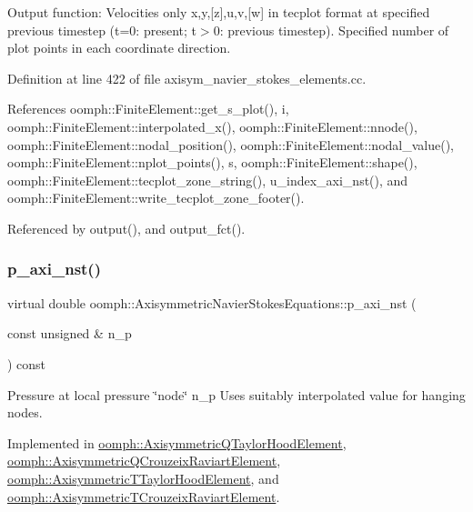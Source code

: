 Output function\+: Velocities only x,y,\mbox{[}z\mbox{]},u,v,\mbox{[}w\mbox{]} in tecplot format at specified previous timestep (t=0\+: present; t$>$0\+: previous timestep). Specified number of plot points in each coordinate direction. 

Definition at line 422 of file axisym\+\_\+navier\+\_\+stokes\+\_\+elements.\+cc.



References oomph\+::\+Finite\+Element\+::get\+\_\+s\+\_\+plot(), i, oomph\+::\+Finite\+Element\+::interpolated\+\_\+x(), oomph\+::\+Finite\+Element\+::nnode(), oomph\+::\+Finite\+Element\+::nodal\+\_\+position(), oomph\+::\+Finite\+Element\+::nodal\+\_\+value(), oomph\+::\+Finite\+Element\+::nplot\+\_\+points(), s, oomph\+::\+Finite\+Element\+::shape(), oomph\+::\+Finite\+Element\+::tecplot\+\_\+zone\+\_\+string(), u\+\_\+index\+\_\+axi\+\_\+nst(), and oomph\+::\+Finite\+Element\+::write\+\_\+tecplot\+\_\+zone\+\_\+footer().



Referenced by output(), and output\+\_\+fct().

\mbox{\label{classoomph_1_1AxisymmetricNavierStokesEquations_a3aa173227f477a40fb4adba84a337f5b}} 
\subsubsection{\texorpdfstring{p\+\_\+axi\+\_\+nst()}{p\_axi\_nst()}}
{\footnotesize\ttfamily virtual double oomph\+::\+Axisymmetric\+Navier\+Stokes\+Equations\+::p\+\_\+axi\+\_\+nst (\begin{DoxyParamCaption}\item[{const unsigned \&}]{n\+\_\+p }\end{DoxyParamCaption}) const\hspace{0.3cm}{\ttfamily [pure virtual]}}



Pressure at local pressure \char`\"{}node\char`\"{} n\+\_\+p Uses suitably interpolated value for hanging nodes. 



Implemented in \hyperlink{classoomph_1_1AxisymmetricQTaylorHoodElement_aec113045099e51a61a1624b0126a05b1}{oomph\+::\+Axisymmetric\+Q\+Taylor\+Hood\+Element}, \hyperlink{classoomph_1_1AxisymmetricQCrouzeixRaviartElement_acaa357820f2efb863d442b66e9761c6d}{oomph\+::\+Axisymmetric\+Q\+Crouzeix\+Raviart\+Element}, \hyperlink{classoomph_1_1AxisymmetricTTaylorHoodElement_ab08a53f82fad2eee4a016d3ebaba0a0a}{oomph\+::\+Axisymmetric\+T\+Taylor\+Hood\+Element}, and \hyperlink{classoomph_1_1AxisymmetricTCrouzeixRaviartElement_a50bbe7b609760f1e41ef35756ef70b31}{oomph\+::\+Axisymmetric\+T\+Crouzeix\+Raviart\+Element}.




